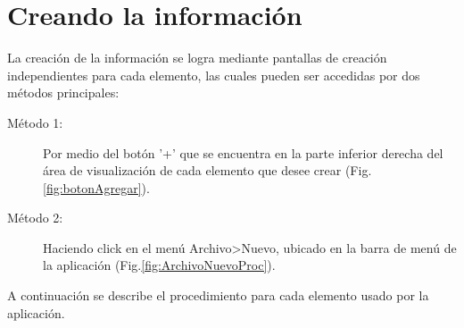 \chapter{Creando la informaci\'on}
\label{sec:creandoLaInformacion}
La creaci\'on de la informaci\'on se logra mediante pantallas de creaci\'on
independientes para cada elemento, las cuales pueden ser accedidas por dos
m\'etodos principales:

\begin{description}
  \item[M\'etodo 1:] Por medio del bot\'on '+' que se encuentra en la parte inferior derecha del \'area de visualizaci\'on de cada elemento que desee crear (Fig.\ref{fig:botonAgregar}). 



  \item[M\'etodo 2:] Haciendo click en el men\'u Archivo>Nuevo, ubicado en la barra de men\'u de la aplicaci\'on (Fig.\ref{fig:ArchivoNuevoProc}). 
  
 
\end{description}
A continuaci\'on se describe el procedimiento para cada elemento usado por la
aplicaci\'on.












